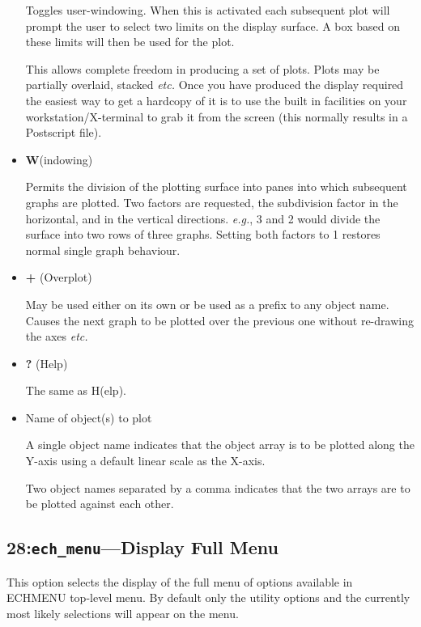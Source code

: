 \documentclass[11pt,twoside]{article}
\makeatletter
\newcommand{\stardocinitials}  {SUN}
\newcommand{\stardocnumber}    {152.4}
\newcommand{\stardocname}{\stardocinitials /\stardocnumber}
\newcommand{\xlabel}[1]{}
\newcommand{\sunspec}[2]{#1}
\renewcommand{\sunspec}[2]{#2}
\newcommand{\myindex}[1]{\index{#1}}
\renewcommand{\myindex}[1]{}
\newcommand{\cmdname}{\begingroup \catcode`\_=12 \realcmdname}
\newcommand{\realcmdname}[1]{\endgroup\texttt{#1}}
\newlength{\sstbannerlength}
\newlength{\sstcaptionlength}
\newcommand{\echtask}[4]{
   \goodbreak
   \rule{\textwidth}{0.5mm}
   \vspace{-7ex}
   \newline
   \settowidth{\sstbannerlength}{{\Large {\bf #3}}}
   \setlength{\sstcaptionlength}{\textwidth}
   \addtolength{\sstbannerlength}{0.5em}
   \addtolength{\sstcaptionlength}{-2.0\sstbannerlength}
   \addtolength{\sstcaptionlength}{-5.0pt}
   \parbox[t]{\sstbannerlength}{\flushleft{\Large {\bf #3}}}
   \parbox[t]{\sstcaptionlength}{\center{\Large #4}}
   \parbox[t]{\sstbannerlength}{\flushright{\Large {\bf #3}}}
   \label{#1}\label{#2}
   \markboth{#3}{\stardocname}
   \uppercase{\myindex{#2@\protect\cmdname{#2}}}
}
\renewcommand{\echtask}[4]
{
  \subsection{\xlabel{#1}\xlabel{#2}\label{#1}\label{#2}#3---#4}
  \markboth{#3}{\stardocname}
}
\makeatother
\begin{document}
\begin{itemize}
     Toggles user-windowing.
     When this is activated each subsequent plot will prompt the user to select
     two limits on the display surface. A box based on these limits will then
     be used for the plot.

     This allows complete freedom in producing a set of plots. Plots may
     be partially overlaid, stacked {\it etc.} Once you have produced the
     display required the easiest way to get a hardcopy of it is to use
     the built in facilities on your workstation/X-terminal to grab it
     from the screen (this normally results in a Postscript file).

\item{\sunspec{\Large\tt}{\bf} W}(indowing)

     Permits the division of the plotting surface
     into panes into which subsequent graphs are plotted. Two factors are
     requested, the subdivision factor in the horizontal, and in the
     vertical directions. {\it{e.g.}}, 3 and 2 would divide the surface
     into two rows of three graphs. Setting both factors to 1 restores
     normal single graph behaviour.

\item{\sunspec{\Large\tt}{\bf} +} (Overplot)
     \myindex{Overlaying graphs}
     \myindex{Plotter!overlaying}

     May be used either on its own or be used as a prefix to any object name.
     Causes the next graph to be plotted over the previous one without
     re-drawing the axes {\it etc.}

\item{\sunspec{\Large \tt}{\bf} ?} (Help)

     The same as H(elp).

\item{Name of object(s) to plot}

     A single object name indicates that the object array is to be plotted
     along the Y-axis using a default linear scale as the X-axis.

     Two object names separated by a comma indicates that the two arrays
     are to be plotted against each other.

\end{itemize}


\echtask{option28}{ech_menu}{28:{\tt ech\_menu}}{Display Full Menu}

This option selects the display of the full menu of options available in
ECHMENU top-level menu. By default only the utility options and the
currently most likely selections will appear on the menu.
\end{document}
